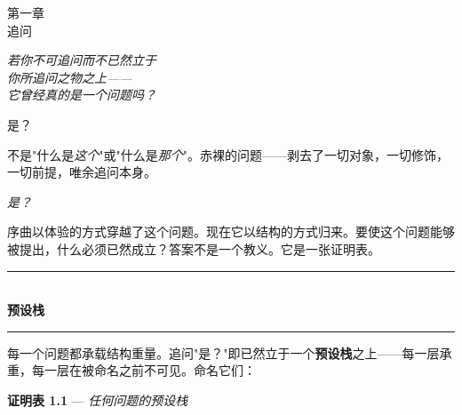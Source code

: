 \documentclass[10pt, openany, oneside]{book}
\renewcommand{\normalsize}{\fontsize{10}{13}\selectfont}
\renewcommand{\large}{\fontsize{11.5}{14}\selectfont}
\renewcommand{\huge}{\fontsize{17}{21}\selectfont}
\begin{document}
\newpage

\begin{center}
    {\huge\scshape 第一章}\\[0.3em]
    {\large\scshape 追问}
\end{center}

\vspace{1.5em}

\begin{center}
    \itshape
    若你不可追问而不已然立于\\
    你所追问之物之上——\\
    它曾经真的是一个问题吗？
\end{center}

\vspace{2em}


\noindent 是？

不是"什么是\textit{这个}"或"什么是\textit{那个}"。赤裸的问题——剥去了一切对象，一切修饰，一切前提，唯余追问本身。

\textit{是？}

序曲以体验的方式穿越了这个问题。现在它以结构的方式归来。要使这个问题能够被提出，什么必须已然成立？答案不是一个教义。它是一张证明表。

\vspace{1.5em}


\begin{center}
    \rule{0.3\textwidth}{0.4pt}\\[0.5em]
    {\normalsize\bfseries\scshape 预设栈}\\[0.3em]
    \rule{0.3\textwidth}{0.4pt}
\end{center}

\vspace{1em}

每一个问题都承载结构重量。追问"是？"即已然立于一个\textbf{预设栈}之上——每一层承重，每一层在被命名之前不可见。命名它们：

\vspace{0.8em}

\textbf{证明表 1.1} --- \textit{任何问题的预设栈}

\vspace{0.5em}
\end{document}
